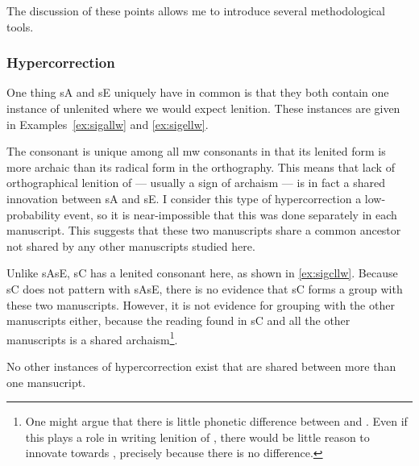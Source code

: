 The discussion of these points allows me to introduce several methodological tools.
\subsubsection{Hypercorrection}
\label{sec:hypercorrection}


One thing \gls{sA} and \gls{sE} uniquely have in common is that they both contain one instance of unlenited  where we would expect lenition. These instances are given in Examples~\ref{ex:sigallw} and \ref{ex:sigellw}.
\begin{mwl}
\end{mwl}


The consonant  is unique among all \gls{mw} consonants in that its lenited form is more archaic than its radical form in the orthography. This means that lack of orthographical lenition of --- usually a sign of archaism --- is in fact a shared innovation between \gls{sA} and \gls{sE}. I consider this type of hypercorrection a low-probability event, so it is  near-impossible that this was done separately in each manuscript.  This suggests that these two manuscripts share a common ancestor not shared by any other manuscripts studied here.

Unlike \gls{sA}\gls{sE}, \gls{sC} has a lenited consonant here, as shown in \ref{ex:sigcllw}.
Because \gls{sC} does not pattern with \gls{sA}\gls{sE}, there is no evidence that \gls{sC} forms a group with these two manuscripts. However, it is not  evidence for grouping with the other manuscripts either, because the reading   found in \gls{sC} and all the other manuscripts is a shared archaism\footnote{One might argue that there is little phonetic difference between  and . Even if this plays a role in writing lenition of , there would be little reason to innovate towards , precisely because there is no difference.}. 

No other instances of hypercorrection exist that are shared between more than one mansucript.

